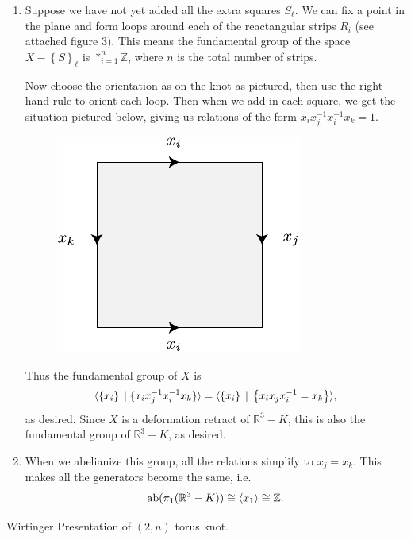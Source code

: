 \documentclass[twoside,10pt]{article}
\begin{document}
\begin{enumerate}
	\item Suppose we have not yet added all the extra squares $S_{\ell}$. We can fix a point in the plane and form loops around each of the reactangular strips $R_{i}$ (see attached figure 3). This means the fundamental group of the space $X - \left\{ S \right\}_{\ell}$ is $*_{i=1}^{n}\mathbb{Z}$, where $n$ is the total number of strips.

		Now choose the orientation as on the knot as pictured, then use the right hand rule to orient each loop. Then when we add in each square, we get the situation pictured below, giving us relations of the form $x_i x_j^{-1} x_i^{-1} x_k=1$.

		\begin{figure}[H]
			\centering
			\includegraphics[scale=1]{fig/22b.pdf}
		\end{figure}

		Thus the fundamental group of $X$ is
		\[
			\langle  \left\{ x_i \right\} \;|\; \{x_i x_j^{-1} x_i^{-1} x_k\}  \rangle = \langle  \left\{ x_i \right\} \;|\; \left\{ x_i x_j x_i^{-1} = x_k \right\} \rangle,
		\] 
		as desired. Since $X$ is a deformation retract of $\mathbb{R}^{3}-K$, this is also the fundamental group of $\mathbb{R}^{3}-K$, as desired.

	\item When we abelianize this group, all the relations simplify to $x_{j}=x_{k}$. This makes all the generators become the same, i.e.
		\[
			\text{ab}(\pi_1(\mathbb{R}^{3}-K)) \cong \langle x_1 \rangle\cong \mathbb{Z}.
		\] 
\end{enumerate}

\newpage

\begin{exer}
	Wirtinger Presentation of $(2,n)$ torus knot.
\end{exer}
\end{document}
